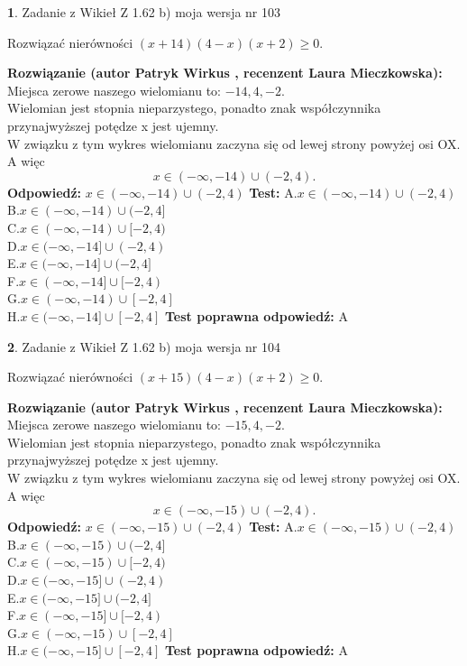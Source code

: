 \documentclass[12pt, a4paper]{article}
\theoremstyle{definition} %
\newtheorem{zad}{}
\newcommand{\zadStart}[1]{\begin{zad}#1\newline}
\newcommand{\zadStop}{\end{zad}}
\newcommand{\rozwStart}[2]{\noindent \textbf{Rozwiązanie (autor #1 , recenzent #2): }\newline}
\newcommand{\rozwStop}{\newline}
\newcommand{\odpStart}{\noindent \textbf{Odpowiedź:}\newline}
\newcommand{\odpStop}{\newline}
\newcommand{\testStart}{\noindent \textbf{Test:}\newline}
\newcommand{\testStop}{\newline}
\newcommand{\kluczStart}{\noindent \textbf{Test poprawna odpowiedź:}\newline}
\newcommand{\kluczStop}{\newline}
\begin{document}
\zadStart{Zadanie z Wikieł Z 1.62 b) moja wersja nr 103}

Rozwiązać nierówności $(x+14)(4-x)(x+2)\ge0$.
\zadStop
\rozwStart{Patryk Wirkus}{Laura Mieczkowska}
Miejsca zerowe naszego wielomianu to: $-14, 4, -2$.\\
Wielomian jest stopnia nieparzystego, ponadto znak współczynnika przy\linebreak najwyższej potędze x jest ujemny.\\ W związku z tym wykres wielomianu zaczyna się od lewej strony powyżej osi OX. A więc $$x \in (-\infty,-14) \cup (-2,4).$$
\rozwStop
\odpStart
$x \in (-\infty,-14) \cup (-2,4)$
\odpStop
\testStart
A.$x \in (-\infty,-14) \cup (-2,4)$\\
B.$x \in (-\infty,-14) \cup (-2,4]$\\
C.$x \in (-\infty,-14) \cup [-2,4)$\\
D.$x \in (-\infty,-14] \cup (-2,4)$\\
E.$x \in (-\infty,-14] \cup (-2,4]$\\
F.$x \in (-\infty,-14] \cup [-2,4)$\\
G.$x \in (-\infty,-14) \cup [-2,4]$\\
H.$x \in (-\infty,-14] \cup [-2,4]$
\testStop
\kluczStart
A
\kluczStop



\zadStart{Zadanie z Wikieł Z 1.62 b) moja wersja nr 104}

Rozwiązać nierówności $(x+15)(4-x)(x+2)\ge0$.
\zadStop
\rozwStart{Patryk Wirkus}{Laura Mieczkowska}
Miejsca zerowe naszego wielomianu to: $-15, 4, -2$.\\
Wielomian jest stopnia nieparzystego, ponadto znak współczynnika przy\linebreak najwyższej potędze x jest ujemny.\\ W związku z tym wykres wielomianu zaczyna się od lewej strony powyżej osi OX. A więc $$x \in (-\infty,-15) \cup (-2,4).$$
\rozwStop
\odpStart
$x \in (-\infty,-15) \cup (-2,4)$
\odpStop
\testStart
A.$x \in (-\infty,-15) \cup (-2,4)$\\
B.$x \in (-\infty,-15) \cup (-2,4]$\\
C.$x \in (-\infty,-15) \cup [-2,4)$\\
D.$x \in (-\infty,-15] \cup (-2,4)$\\
E.$x \in (-\infty,-15] \cup (-2,4]$\\
F.$x \in (-\infty,-15] \cup [-2,4)$\\
G.$x \in (-\infty,-15) \cup [-2,4]$\\
H.$x \in (-\infty,-15] \cup [-2,4]$
\testStop
\kluczStart
A
\kluczStop
\end{document}
